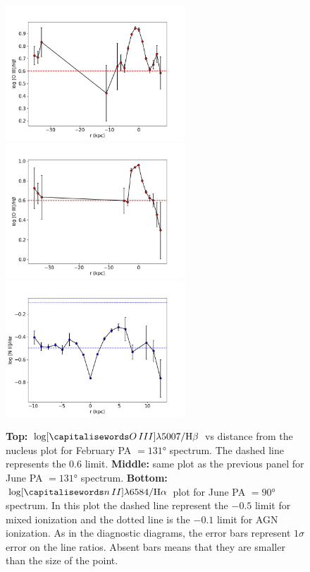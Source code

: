 \documentclass[../main.tex]{subfiles}
\begin{document}
\begin{figure}
\centering
\includegraphics[width=0.6\textwidth]{images/paper3/PA131_2016_o3_hb.jpg}\\ 
\includegraphics[width=0.6\textwidth]{images/paper3/PA131_o3_hb.jpg}\\ 
\includegraphics[width=0.6\textwidth]{images/paper3/PA90_n2_ha.jpg}\\ 
\caption[]{\textbf{Top:} $\log [\ion{O}{III}]\lambda5007/\Hb$ vs distance from the nucleus plot for February PA $=\ang{131}$ spectrum. The dashed line represents the $0.6$ limit.
\textbf{Middle:} same plot as the previous panel for June PA $=\ang{131}$ spectrum.
\textbf{Bottom:} $\log [\ion{n}{II}]\lambda6584/\Ha$ plot for June PA $=\ang{90}$ spectrum. In this plot the dashed line represent the $-0.5$ limit for mixed ionization and the dotted line is the $-0.1$ limit for AGN ionization. As in the diagnostic diagrams, the error bars represent $1\sigma$ error on the line ratios. Absent bars means that they are smaller than the size of the point.}
\label{fig:o3hb_ratio}
\end{figure} 
\end{document}

